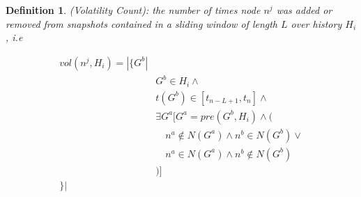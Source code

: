 \documentclass[abstracton,12pt]{scrreprt}
\newtheorem{definition}{Definition}
\begin{document}
\begin{definition}
    (Volatility Count): the number of times node $n^j$ was added or removed from snapshots contained in a sliding window of length $L$ over history $H_i$, i.e
    \begin{large}
        \begin{equation}
            \begin{split}
                vol(n^j, H_i) = | \{ G^b | \\
                & G^b \in H_i \land \\
                & t(G^b) \in [t_{n-L+1}, t_n] \land \\
                & \exists G^a[ G^a = pre(G^b, H_i) \land (\\
                & \quad n^a \notin N(G^a) \land n^b \in N(G^b) \lor \\ 
                & \quad n^a \in N(G^a) \land n^b \notin N(G^b) \\
                & )] \\
                \} |
            \end{split}
        \end{equation}
    \end{large}
    \label{def:vol_count}
\end{definition}
\end{document}
